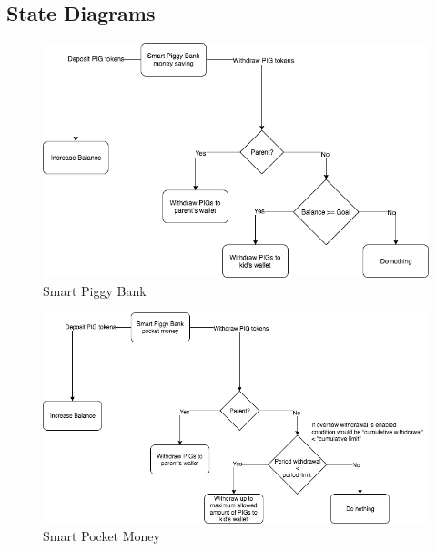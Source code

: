 \documentclass[english]{article}
\begin{document}
\begin{appendices}
\section{State Diagrams}

\begin{figure}[h]
    \centering
    \includegraphics[width=1\textwidth]{PiggyBank-StateDiagram1.png}
    \caption{Smart Piggy Bank}
    \label{fig:piggy-diagram}
\end{figure}

\begin{figure}[h]
    \centering
    \includegraphics[width=1\textwidth]{PiggyBank-StateDiagram2.png}
    \caption{Smart Pocket Money}
    \label{fig:piggy-diagram}
\end{figure}

\end{appendices}
\end{document}
